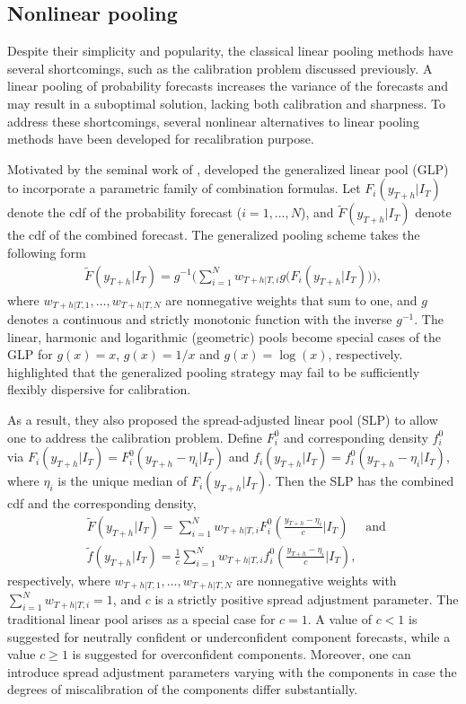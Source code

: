 \documentclass[a4paper,11pt]{article}
\begin{document}
\subsection{Nonlinear pooling}
\label{sec:nonlinear_pooling}

Despite their simplicity and popularity, the classical linear pooling methods have several shortcomings, such as the calibration problem discussed previously. A linear pooling of probability forecasts increases the variance of the forecasts and may result in a suboptimal solution, lacking both calibration and sharpness. To address these shortcomings, several nonlinear alternatives to linear pooling methods have been developed for recalibration purpose.

Motivated by the seminal work of \citet{Dawid1995-jj}, \citet{Gneiting2013-hl} developed the generalized linear pool (GLP) to incorporate a parametric family of combination formulas. Let $F_{i}(y_{T+h}|I_{T})$ denote the cdf of the probability forecast ($i=1,\dots,N$), and $\tilde{F}(y_{T+h}|I_{T})$ denote the cdf of the combined forecast. The generalized pooling scheme takes the following form
\begin{align*}
  \tilde{F}(y_{T+h}|I_{T}) = g^{-1}\bigg(\sum_{i=1}^{N} w_{T+h|T,i} g\big(F_{i}(y_{T+h}|I_{T})\big)\bigg),
\end{align*}
where $w_{T+h|T,1},\dots,w_{T+h|T,N}$ are nonnegative weights that sum to one, and $g$ denotes a continuous and strictly monotonic function with the inverse $g^{-1}$. The linear, harmonic and logarithmic (geometric) pools become special cases of the GLP for $g(x)=x$, $g(x)=1/x$ and $g(x)=\log(x)$, respectively. \citet{Gneiting2013-hl} highlighted that the generalized pooling strategy may fail to be sufficiently flexibly dispersive for calibration.

As a result, they also proposed the spread-adjusted linear pool (SLP) to allow one to address the calibration problem. Define $F_{i}^{0}$ and corresponding density $f_{i}^{0}$ via $F_{i}(y_{T+h}|I_{T})=F_{i}^{0}(y_{T+h}-\eta_{i}|I_{T})$ and $f_{i}(y_{T+h}|I_{T})=f_{i}^{0}(y_{T+h}-\eta_{i}|I_{T})$, where $\eta_{i}$ is the unique median of $F_{i}(y_{T+h}|I_{T})$. Then the SLP has the combined cdf and the corresponding density,
\begin{align*}
   & \tilde{F}(y_{T+h}|I_{T})=\sum_{i=1}^{N} w_{T+h|T,i} F_{i}^{0}\left(\frac{y_{T+h}-\eta_{i}}{c}\bigg|I_{T}\right) \quad \text { and } \\
   & \tilde{f}(y_{T+h}|I_{T})=\frac{1}{c} \sum_{i=1}^{N} w_{T+h|T,i} f_{i}^{0}\left(\frac{y_{T+h}-\eta_{i}}{c}\bigg|I_{T}\right),
\end{align*}
respectively, where $w_{T+h|T,1},\dots,w_{T+h|T,N}$ are nonnegative weights with $\sum_{i=1}^{N}w_{T+h|T,i}=1$, and $c$ is a strictly positive spread adjustment parameter. The traditional linear pool arises as a special case for $c = 1$. A value of $c < 1$ is suggested for neutrally confident or underconfident component forecasts, while a value $c \geq 1$ is suggested for overconfident components. Moreover, one can introduce spread adjustment parameters varying with the components in case the degrees of miscalibration of the components differ substantially.
\end{document}
